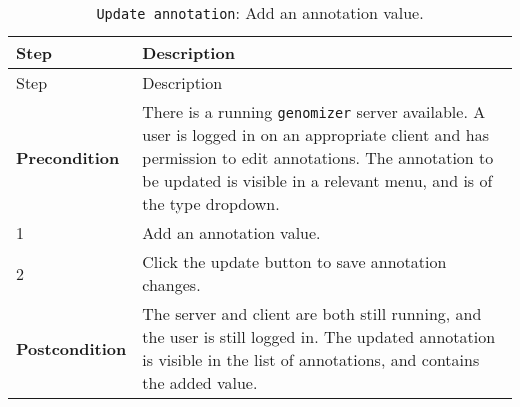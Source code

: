 \begin{longtable}[c]{@{}ll@{}}
\caption{\texttt{Update\ annotation}: Add an annotation
value.}\tabularnewline
\toprule
\begin{minipage}[b]{0.31\columnwidth}\raggedright\strut
Step
\strut\end{minipage} &
\begin{minipage}[b]{0.63\columnwidth}\raggedright\strut
Description
\strut\end{minipage}\tabularnewline
\midrule
\endfirsthead
\toprule
\begin{minipage}[b]{0.31\columnwidth}\raggedright\strut
Step
\strut\end{minipage} &
\begin{minipage}[b]{0.63\columnwidth}\raggedright\strut
Description
\strut\end{minipage}\tabularnewline
\midrule
\endhead
\begin{minipage}[t]{0.31\columnwidth}\raggedright\strut
\textbf{Precondition}
\strut\end{minipage} &
\begin{minipage}[t]{0.63\columnwidth}\raggedright\strut
There is a running \texttt{genomizer} server available. A user is logged
in on an appropriate client and has permission to edit annotations. The
annotation to be updated is visible in a relevant menu, and is of the
type dropdown.
\strut\end{minipage}\tabularnewline
\begin{minipage}[t]{0.31\columnwidth}\raggedright\strut
1
\strut\end{minipage} &
\begin{minipage}[t]{0.63\columnwidth}\raggedright\strut
Add an annotation value.
\strut\end{minipage}\tabularnewline
\begin{minipage}[t]{0.31\columnwidth}\raggedright\strut
2
\strut\end{minipage} &
\begin{minipage}[t]{0.63\columnwidth}\raggedright\strut
Click the update button to save annotation changes.
\strut\end{minipage}\tabularnewline
\begin{minipage}[t]{0.31\columnwidth}\raggedright\strut
\textbf{Postcondition}
\strut\end{minipage} &
\begin{minipage}[t]{0.63\columnwidth}\raggedright\strut
The server and client are both still running, and the user is still
logged in. The updated annotation is visible in the list of annotations,
and contains the added value.
\strut\end{minipage}\tabularnewline
\bottomrule
\end{longtable}

